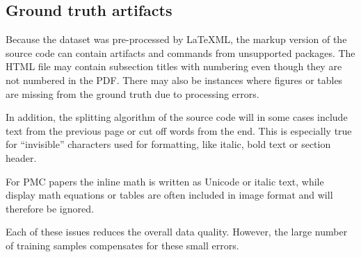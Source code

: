 \documentclass[]{article}
\begin{document}
\subsection{Ground truth artifacts}\label{seq:artifacts}

Because the dataset was pre-processed by LaTeXML, the markup version of the source code can contain artifacts and commands from unsupported packages. The HTML file may contain subsection titles with numbering even though they are not numbered in the PDF. There may also be instances where figures or tables are missing from the ground truth due to processing errors.

In addition, the splitting algorithm of the source code will in some cases include text from the previous page or cut off words from the end. This is especially true for ``invisible'' characters used for formatting, like italic, bold text or section header.

For PMC papers the inline math is written as Unicode or italic text, while display math equations or tables are often included in image format and will therefore be ignored.

Each of these issues reduces the overall data quality. However, the large number of training samples compensates for these small errors.
\end{document}
